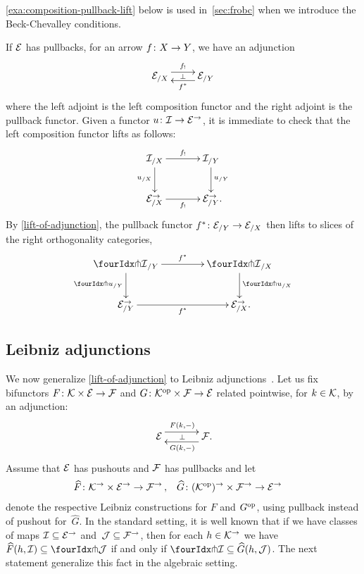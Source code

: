 \documentclass[reqno,10pt,a4paper,oneside,draft]{amsart}
\begin{document}
\cref{exa:composition-pullback-lift} below is used in~\cref{sec:frobc} when we introduce the Beck-Chevalley conditions.

\begin{remark} \label{exa:composition-pullback-lift}
If $\cal{E}$ has pullbacks, for an arrow $f \co X \to Y$, we have an adjunction
\[
\xymatrix{
  \catE_{/X}
  \ar@<1ex>[r]^{f_!}
  \ar@{}[r]|{\bot}
&
  \catE_{/Y}
  \ar@<1ex>[l]^{f^*}
}
\]
where the left adjoint is the left composition functor and the right adjoint is the pullback functor.
Given a functor $u \co \cal{I} \to \catE^\to$, it is immediate to check that the left composition functor lifts as follows:
\[
\xymatrix@C+1em{
  \cal{I}_{/X}
  \ar[r]^-{f_!}
  \ar[d]_{u_{/X}}
&
  \cal{I}_{/Y}
  \ar[d]^{u_{/Y}}
\\
  \calE_{/X}^\to
  \ar[r]_-{f_!}
&
  \calE_{/Y}^\to
\rlap{.}}
\]
By \cref{lift-of-adjunction}, the pullback functor $f^* \co \catE_{/Y} \to \catE_{/X}$ then lifts to slices of the right orthogonality categories,
\[
\xymatrix@C=1.5cm{
  \liftr{\cal{I}}_{/Y}
  \ar[d]_{{\liftr{u}}_{/Y}}
  \ar[r]^{f^*}
&
  \liftr{\cal{I}}_{/X}
  \ar[d]^{{\liftr{u}}_{/X}}
\\
  {\catE}_{/Y}^\to
  \ar[r]_{f^*}
&
  \catE_{/X}^\to
\rlap{.}}
\]
\end{remark}

\subsection*{Leibniz adjunctions}

We  now generalize \cref{lift-of-adjunction} to Leibniz adjunctions~\cite{riehl-verity:reedy}.
Let us fix bifunctors $F \co \cal{K} \times \catE \to \cal{F}$ and $G \co \cal{K}^{\op} \times \cal{F} \to \catE$ related pointwise, for $k \in \cal{K}$, by an adjunction:
\[
\xymatrix@C+1em{
  \catE
  \ar@<5pt>[r]^{F(k, \arghole)}
  \ar@{}[r]|{\bot}
&
  \cal{F}
  \ar@<5pt>[l]^{G(k, \arghole)}
\rlap{.}}
\]
Assume that $\catE$ has pushouts and $\cal{F}$ has pullbacks and 
let
\[
\begin{aligned}
  \widehat{F} &\co \cal{K}^\to \times \catE^\to \to \cal{F}^\to
\, ,&
  \widehat{G} &\co (\cal{K}^{\op})^\to \times \cal{F}^\to \to \catE^\to
\end{aligned}
\]
denote the respective Leibniz constructions for $F$ and $G^{\op}$, using pullback instead of pushout for~$\widehat{G}$.
In the standard setting, it is well known that if we have classes of maps $\cal{I} \subseteq \catE^\to$ and~$\cal{J} \subseteq \cal{F}^\to$, then for each $h \in \cal{K}^\to$ we have $\widehat{F}(h, \cal{I}) \subseteq \liftl{\cal{J}}$ if and only if $\liftr{\cal{I}} \subseteq \widehat{G}(h, \cal{J})$.
The next statement generalize this fact in the algebraic setting.
\end{document}
